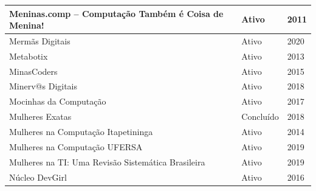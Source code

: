 \begin{longtable}{|l|l|l|}
Meninas.comp – Computação Também é Coisa de Menina!                                                                                                         & Ativo                        & 2011                        \\ \hline
  
Mermãs Digitais                                                                                                                                             & Ativo                        & 2020                        \\ \hline
  
Metabotix                                                                                                                                                   & Ativo                        & 2013                        \\ \hline
  
MinasCoders                                                                                                                                                 & Ativo                        & 2015                        \\ \hline
  
Minerv@s Digitais                                                                                                                                           & Ativo                        & 2018                        \\ \hline
Mocinhas da Computação                                                                                                                                      & Ativo                        & 2017                        \\ \hline
Mulheres Exatas                                                                                                                                             & Concluído                    & 2018                        \\ \hline
  
Mulheres na Computação Itapetininga                                                                                                                         & Ativo                        & 2014                        \\ \hline
  
Mulheres na Computação UFERSA                                                                                                                               & Ativo                        & 2019                        \\ \hline
Mulheres na TI: Uma Revisão Sistemática Brasileira                                                                                                          & Ativo                        & 2019                        \\ \hline
Núcleo DevGirl                                                                                                                                              & Ativo                        & 2016                        \\ \hline
  

\end{longtable}
